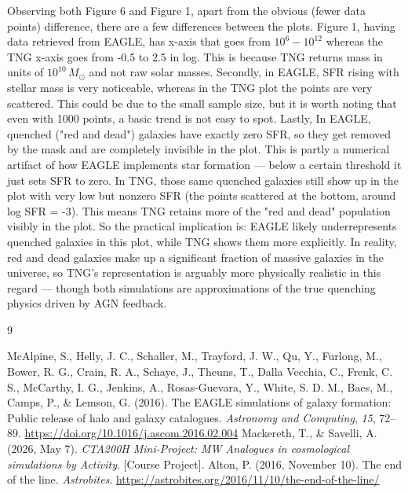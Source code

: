\documentclass{article}
\begin{document}
Observing both Figure 6 and Figure 1, apart from the obvious (fewer data points) difference, there are a few differences between the plots. Figure 1, having data retrieved from EAGLE, has x-axis that goes from $10^6 - 10^{12}$ whereas the TNG x-axis goes from -0.5 to 2.5 in log. This is because TNG returns mass in units of $10^{10} \, M_{\odot}$ and not raw solar masses. Secondly, in EAGLE, SFR rising with stellar mass is very noticeable, whereas in the TNG plot the points are very scattered. This could be due to the small sample size, but it is worth noting that even with 1000 points, a basic trend is not easy to spot. 
Lastly, In EAGLE, quenched ("red and dead") galaxies have exactly zero SFR, so they get removed by the mask and are completely invisible in the plot. This is partly a numerical artifact of how EAGLE implements star formation — below a certain threshold it just sets SFR to zero.
In TNG, those same quenched galaxies still show up in the plot with very low but nonzero SFR (the points scattered at the bottom, around log SFR = -3). This means TNG retains more of the "red and dead" population visibly in the plot.
So the practical implication is: EAGLE likely underrepresents quenched galaxies in this plot, while TNG shows them more explicitly. In reality, red and dead galaxies make up a significant fraction of massive galaxies in the universe, so TNG's representation is arguably more physically realistic in this regard — though both simulations are approximations of the true quenching physics driven by AGN feedback.

\clearpage %

\begin{thebibliography}{9}

McAlpine, S., Helly, J. C., Schaller, M., Trayford, J. W., Qu, Y., Furlong, M., Bower, R. G., Crain, R. A., Schaye, J., Theuns, T., Dalla Vecchia, C., Frenk, C. S., McCarthy, I. G., Jenkins, A., Rosas-Guevara, Y., White, S. D. M., Baes, M., Camps, P., \& Lemson, G. (2016). 
The EAGLE simulations of galaxy formation: Public release of halo and galaxy catalogues. 
\textit{Astronomy and Computing}, \textit{15}, 72--89. 
\url{https://doi.org/10.1016/j.ascom.2016.02.004}
Mackereth, T., \& Savelli, A. (2026, May 7). 
\textit{CTA200H Mini-Project: MW Analogues in cosmological simulations by Activity}. 
[Course Project].
Alton, P. (2016, November 10). 
The end of the line. 
\textit{Astrobites}. 
\url{https://astrobites.org/2016/11/10/the-end-of-the-line/}


\end{thebibliography}
\end{document}
